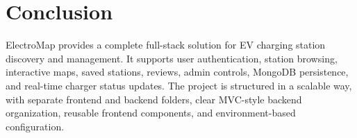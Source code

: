 \documentclass[12pt,a4paper]{article}
\begin{document}
\section{Conclusion}

ElectroMap provides a complete full-stack solution for EV charging station discovery and management. It supports user authentication, station browsing, interactive maps, saved stations, reviews, admin controls, MongoDB persistence, and real-time charger status updates. The project is structured in a scalable way, with separate frontend and backend folders, clear MVC-style backend organization, reusable frontend components, and environment-based configuration.
\end{document}
